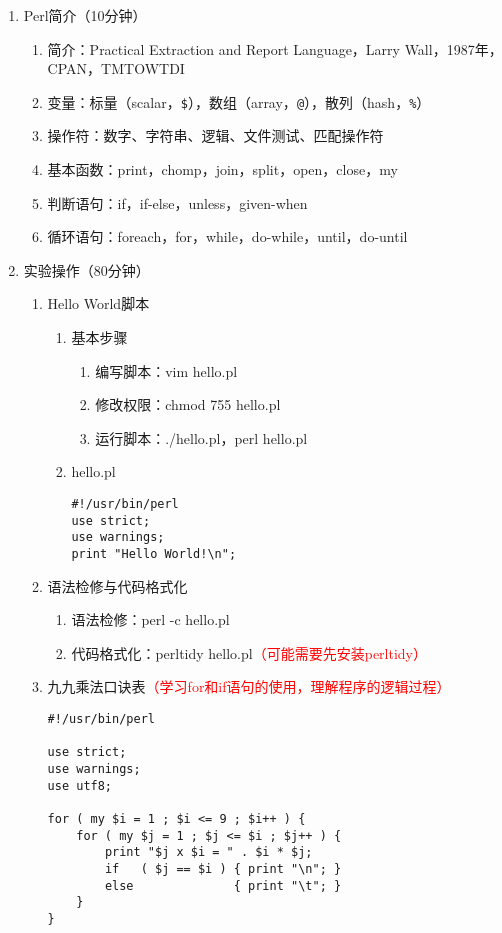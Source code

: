 \documentclass{TIJMUjiaoanSY}
\begin{document}
\firstTail

\newpage
\otherHeader

\begin{enumerate}
  \item Perl简介（10分钟）
    \begin{enumerate}
      \item 简介：Practical Extraction and Report Language，Larry Wall，1987年，CPAN，TMTOWTDI
      \item 变量：标量（scalar，\verb|$|），数组（array，\verb|@|），散列（hash，\verb|%|）
      \item 操作符：数字、字符串、逻辑、文件测试、匹配操作符
      \item 基本函数：print，chomp，join，split，open，close，my
      \item 判断语句：if，if-else，unless，given-when
      \item 循环语句：foreach，for，while，do-while，until，do-until
    \end{enumerate}
  \item 实验操作（80分钟）
    \begin{enumerate}
      \item Hello World脚本
\vspace*{-1em}
\begin{multicols}{2}
	\begin{enumerate}
	  \item 基本步骤
	    \begin{enumerate}
	      \item 编写脚本：vim hello.pl
	      \item 修改权限：chmod 755 hello.pl
	      \item 运行脚本：./hello.pl，perl hello.pl
	    \end{enumerate}
	  \item hello.pl
\begin{verbatim}
#!/usr/bin/perl
use strict;
use warnings;
print "Hello World!\n";
\end{verbatim}
	\end{enumerate}
\end{multicols}
\vspace*{-1em}
      \item 语法检修与代码格式化
	\begin{enumerate}
	  \item 语法检修：perl -c hello.pl
	  \item 代码格式化：perltidy hello.pl\textcolor{red}{（可能需要先安装perltidy）}
	\end{enumerate}
      \item 九九乘法口诀表\textcolor{red}{（学习for和if语句的使用，理解程序的逻辑过程）}
\begin{verbatim}
#!/usr/bin/perl

use strict;
use warnings;
use utf8;

for ( my $i = 1 ; $i <= 9 ; $i++ ) {
    for ( my $j = 1 ; $j <= $i ; $j++ ) {
        print "$j x $i = " . $i * $j;
        if   ( $j == $i ) { print "\n"; }
        else              { print "\t"; }
    }
}
\end{verbatim}
    \end{enumerate}
\end{enumerate}

\otherTail
\end{document}
